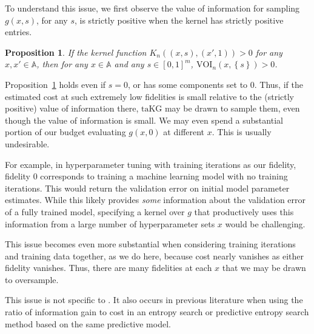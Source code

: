 \documentclass[letterpaper]{article}
\newcommand{\taKG}{\text{taKG}}
\newtheorem{proposition}{Proposition}
\numberwithin{equation}{section}
\begin{document}
To understand this issue, we first observe the value of information for sampling $g(x,s)$, for any $s$, is strictly positive when the kernel has strictly positive entries.
\begin{proposition}
If the kernel function $K_n((x, s), (x', 1)) > 0$ for any $x, x' \in \mathbb{A}$, then for any $x \in \mathbb{A}$ and any $s\in[0,1]^m$, $\text{VOI}_n(x, \left\{ s\right\}) > 0$.
\label{prop:positive}
\end{proposition}

Proposition~\ref{prop:positive} holds even if $s=0$, or has some components set to 0.
Thus, if the estimated cost at such extremely low fidelities is small relative to the (strictly positive) value of information there, $\taKG$ may be drawn to sample them, even though the value of information is small.  We may even spend a substantial portion of our budget evaluating $g(x,0)$ at different $x$.
This is usually undesirable.

For example, in hyperparameter tuning with training iterations as our fidelity, 
fidelity $0$ corresponds to training a machine learning model with no training iterations.
This would return the validation error on initial model parameter estimates.
While this likely provides {\it some} information about the validation error of a fully trained model, 
specifying a kernel over $g$ that productively uses this information from a large number of hyperparameter sets $x$ 
would be challenging.

This issue becomes even more substantial when considering training iterations
and training data together, as we do here, because cost nearly vanishes
as either fidelity vanishes.  Thus, there are many
fidelities at each $x$ that we may be drawn to oversample.

This issue is not specific to \taKG. 
It also occurs in previous literature 
\citep{klein2016fast,mcleod2017practical,klein-bayesopt17}
when using the ratio of information gain to cost in 
an entropy search or predictive entropy search method based on the same predictive model.

\end{document}
